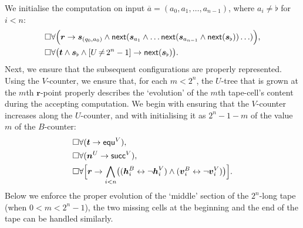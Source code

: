 \documentclass{lmcs} %
\theoremstyle{plain}\newtheorem{satz}[thm]{Satz} %
\newcommand{\fform}[1]{\boldsymbol{#1}}
\newcommand{\svar}{\fform{s}}
\newcommand{\hvar}{\fform{h}}
\newcommand{\vvar}{\fform{v}}
\newcommand{\blank}{\flat}
\newcommand{\cR}{B}
\newcommand{\cU}{U}
\newcommand{\cV}{V}
\newcommand{\cvf}[3]{[{#1}\mathop{#2}{#3}]}
\newcommand{\inpw}{\overline{a}}
\newcommand{\inpww}{a}
\newcommand{\nextU}{\fform{n}^\cU}
\newcommand{\nextV}{\scc^\cV}
\newcommand{\Bv}{\forall}
\newcommand{\Bh}{\Box}
\newcommand{\start}{\fform{r}}
\newcommand{\nextt}[1]{\mathsf{next}({#1})}
\newcommand{\grid}{\mathsf{equ}}
\newcommand{\scc}{\mathsf{succ}}
\newcommand{\tree}{\fform{t}}
\begin{document}
	We initialise the computation on input $\inpw=(\inpww_0,\inpww_1,\dots, \inpww_{n-1})$, where $\inpww_i\ne\blank$ for $i<n$:
	\begin{align}\label{cinit}
		& \Bh\Bv\Bigl(\start\to\svar_{(q_0,\inpww_0)} \land\nextt{\svar_{\inpww_1}\land\dots\nextt{\svar_{\inpww_{n-1}}\land\nextt{\svar_\blank}}\dots}\Bigr),\\
		& \Bh\Bv\bigl(\tree\land\svar_\blank\land\cvf{\cU}{\ne}{2^n-1}\to\nextt{\svar_\blank}\bigr).
	\end{align}
	Next, we ensure that the subsequent configurations are properly represented. 
	Using the $\cV$-counter,
	we ensure that, for each $m<2^n$, the $\cU$-tree 
	that is grown at the $m$th $\start$-point 
	properly describes the `evolution' of the $m$th tape-cell's content during the accepting computation. 
	We begin with ensuring that the $\cV$-counter increases along the $\cU$-counter, and with initialising it as $2^n-1-m$ of the value $m$ of the $\cR$-counter:
	\begin{align}
		& \Bh\Bv(\tree\to\grid^\cV),\\
		& \Bh\Bv(\nextU\to\nextV),\\
		\label{Vinit}
		& \Bh\Bv\Bigl[\start\to\bigwedge_{i<n}\bigl((\hvar_i^\cR\leftrightarrow \neg \hvar_i^\cV)\land(\vvar_i^\cR\leftrightarrow \neg \vvar_i^\cV)\bigr)\Bigr].
	\end{align}
	Below we enforce the proper evolution of the `middle' section of the $2^n$-long tape (when $0<m<2^n-1$), the two missing cells at the beginning and the end of the tape can be handled similarly. 
	
\end{document}
